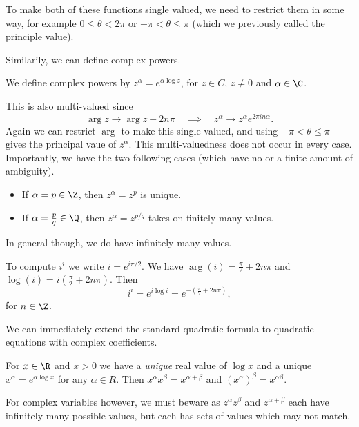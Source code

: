 \documentclass[a4]{scrartcl}
\begin{document}
To make both of these functions single valued, we need to restrict them in some way, for example $0 \leq \theta < 2 \pi$ or $- \pi < \theta \leq \pi$ (which we previously called the principle value).

Similarily, we can define complex powers.

\begin{definition}
	We define complex powers by $z^\alpha = e^{\alpha \log z}$, for $z \in C$, $z \neq 0$ and $\alpha \in \C$.
\end{definition}

This is also multi-valued since
$$
\arg z \rightarrow \arg z + 2n \pi \quad \implies \quad z^\alpha \rightarrow z^\alpha e^{2 \pi i n \alpha}.
$$
Again we can restrict $\arg$ to make this single valued, and using $- \pi < \theta \leq \pi$ gives the principal vaue of $z^\alpha$. This multi-valuedness does not occur in every case. Importantly, we have the two following cases (which have no or a finite amount of ambiguity).
\begin{itemize}
	\item If $\alpha = p \in \Z$, then $z^\alpha = z^p$ is unique.
	\item If $\alpha = \frac{p}{q} \in \Q$, then $z^\alpha = z^{p / q}$ takes on finitely many values. 
\end{itemize}
In general though, we do have infinitely many values.

\begin{example}
	To compute $i^i$ we write $i = e^{i \pi/2}$. We have $\arg(i) = \frac{\pi}{2} + 2n \pi$ and $\log(i) = i\left(\frac{\pi}{2} + 2n \pi\right)$. Then
	$$
i^i = e^{i \log i} = e^{-\left(\frac{\pi}{2} + 2n \pi\right)},
	$$
	for $n \in \Z$.
\end{example}

\begin{remark}
	We can immediately extend the standard quadratic formula to quadratic equations with complex coefficients.
\end{remark}

\begin{remark}
	For $x\in\R$ and $x > 0$ we have a \emph{unique} real value of $\log x$ and a unique $x^\alpha = e^{\alpha \log x}$ for any $\alpha \in R$. Then $x^{\alpha} x^{\beta} = x^{\alpha + \beta}$ and $(x^\alpha)^\beta = x^{\alpha \beta}$.
	
	For complex variables however, we must beware as $z^{\alpha} z^{\beta}$ and $z^{\alpha + \beta}$ each have infinitely many possible values, but each has sets of values which may not match.
\end{remark}
\end{document}
